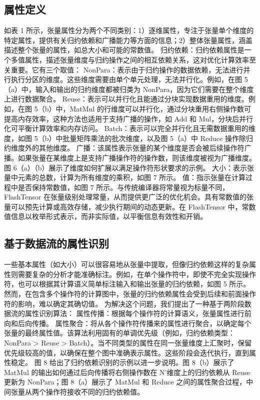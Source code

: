 \subsection{属性定义}
如表 1 所示，张量属性分为两个不同类别：1）逐维属性，专注于张量单个维度的特定属性，提供有关归约依赖和广播能力等方面的信息；2）整体张量属性，涵盖描述整个张量的属性，如总大小和可能的常数值。
归约依赖：归约依赖属性是一个多值属性，描述张量维度与归约操作之间的相互依赖关系，这对优化计算效率至关重要。它有三个取值：
NonPara：表示由于归约操作的数据依赖，无法进行并行执行分区的维度。这些维度需要由单个单元处理，无法并行化。例如，在图 5（a）中，输入和输出的归约维度都被归类为 NonPara，因为它们需要在整个维度上进行数据聚合。
Reuse：表示可以并行化且能通过分块实现数据重用的维度。例如，在图 5（b）中，MatMul 的行维度可以并行化，通过分块重用右侧操作数可提高内存效率，这种方法也适用于支持广播的操作，如 Add 和 Mul，分块后并行化可平衡计算效率和内存访问。
Batch：表示可以完全并行化且无需数据重用的维度，如图 5（b）中批量矩阵乘法的批次维度，以及图 5（a）中 Reduce 操作除归约维度外的其他维度。
广播：该属性表示张量的某个维度是否会被后续操作符广播。如果张量在某维度上是支持广播操作符的操作数，则该维度被视为广播维度。图 6（a）（b）展示了维度如何扩展以满足操作符形状要求的示例。
大小：表示张量中元素的总数，计算为所有维度的乘积，如图 7 所示。
值：指示张量在计算过程中是否保持常数值，如图 7 所示。与传统编译器将常量视为标量不同，FlashTensor 在张量级别处理常量，从而提供更广泛的优化机会。具有常数值的张量可以预先计算或高效存储，减少执行期间的动态更新。在 FlashTensor 中，常数值信息以枚举形式表示，而非实际值，以平衡信息有效性和开销。
\subsection{基于数据流的属性识别}
一些基本属性（如大小）可以很容易地从张量中提取，但像归约依赖这样的复杂属性则需要复杂的分析才能准确标注。例如，在单个操作符中，即使不完全实现操作符，也可以根据其计算语义简单标注输入和输出张量的归约依赖，如图 5 所示。然而，在包含多个操作符的计算图中，张量的归约依赖属性会受到后续和前面操作符的影响，难以确定其确切值。
为解决这个问题，我们提出了一种基于两阶段数据流的属性识别算法：
属性传播：根据每个操作符的计算语义，张量属性进行前向和后向传播。
属性聚合：将从各个操作符传播来的属性进行聚合，以确定每个张量的最终属性值。该算法利用固有的单调优先级（例如，归约依赖类型：NonPara > Reuse > Batch）。当不同类型的属性在同一张量维度上汇聚时，保留优先级较高的值，以确保在整个图中准确表示属性。这些阶段会迭代执行，直到属性稳定。
图 8 给出了归约依赖识别的示例以进一步说明。图 8（b）展示了 MatMul 的输出如何通过后向传播将右侧操作数在 N’维度上的归约依赖从 Reuse 更新为 NonPara；图 8（a）展示了 MatMul 和 Reduce 之间的属性聚合过程，中间张量从两个操作符接收不同的归约依赖值。

